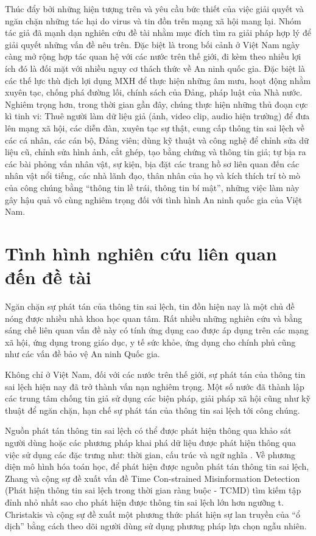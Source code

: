 Thúc đẩy bởi những hiện tượng trên và yêu cầu bức thiết của việc giải quyết và ngăn chặn những tác hại do virus và tin đồn trên mạng xã hội mang lại. Nhóm tác giả đã mạnh dạn nghiên cứu đề tài nhằm mục đích tìm ra giải pháp hợp lý để giải quyết những vấn đề nêu trên. Đặc biệt là trong bối cảnh ở Việt Nam ngày càng mở rộng hợp tác quan hệ với các nước trên thế giới, đi kèm theo nhiều lợi ích đó là đối mặt với nhiều nguy cơ thách thức về An ninh quốc gia. Đặc biệt là các thế lực thù địch lợi dụng MXH để thực hiện những âm mưu, hoạt động nhằm xuyên tạc, chống phá đường lối, chính sách của Đảng, pháp luật của Nhà nước. Nghiêm trọng hơn, trong thời gian gần đây, chúng thực hiện những thủ đoạn cực kì tinh vi: Thuê người làm dữ liệu giả (ảnh, video clip, audio hiện trường) để đưa lên mạng xã hội, các diễn đàn, xuyên tạc sự thật, cung cấp thông tin sai lệch về các cá nhân, các cán bộ, Đảng viên; dùng kỹ thuật và công nghệ để chỉnh sửa dữ liệu cũ, chỉnh sửa hình ảnh, cắt ghép, tạo bằng chứng và thông tin giả; tự bịa ra các bài phỏng vấn nhân vật, sự kiện, bịa đặt các trang hồ sơ liên quan đến các nhân vật nổi tiếng, các nhà lãnh đạo, thân nhân của họ và kích thích trí tò mò của công chúng bằng “thông tin lề trái, thông tin bí mật”, những việc làm này gây hậu quả vô cùng nghiêm trọng đối với tình hình An ninh quốc gia của Việt Nam.

\tocless\section{Tình hình nghiên cứu liên quan đến đề tài}
Ngăn chặn sự phát tán của thông tin sai lệch, tin đồn hiện nay là một chủ đề nóng được nhiều nhà khoa học quan tâm. Rất nhiều những nghiên cứu và bằng sáng chế liên quan vấn đề này có tính ứng dụng cao được áp dụng trên các mạng xã hội, ứng dụng trong giáo dục, y tế sức khỏe, ứng dụng cho chính phủ cũng như các vấn đề bảo vệ An ninh Quốc gia. 

Không chỉ ở Việt Nam, đối với các nước trên thế giới, sự phát tán của thông tin sai lệch hiện nay đã trở thành vấn nạn nghiêm trọng. Một số nước đã thành lập các trung tâm chống tin giả sử dụng các biện pháp, giải pháp xã hội cũng như kỹ thuật để ngăn chặn, hạn chế sự phát tán của thông tin sai lệch tới công chúng.

Nguồn phát tán thông tin sai lệch có thể được phát hiện thông qua khảo sát người dùng hoặc các phương pháp khai phá dữ liệu được phát hiện thông qua việc sử dụng các đặc trưng như: thời gian, cấu trúc và ngữ nghĩa \cite{nguyen9}. Về phương diện mô hình hóa toán học, để phát hiện được nguồn phát tán thông tin sai lệch, Zhang và cộng sự đề xuất vấn đề Time Con-strained Misinformation Detection (Phát hiện thông tin sai lệch trong thời gian ràng buộc - TCMD) tìm kiếm tập đỉnh nhỏ nhất sao cho phát hiện được thông tin sai lệch lớn hơn ngưỡng t. Christakis \cite{chris} và cộng sự đề xuất một phương thức phát hiện sự lan truyền của “ổ dịch” bằng cách theo dõi người dùng sử dụng phương pháp lựa chọn ngẫu nhiên.

